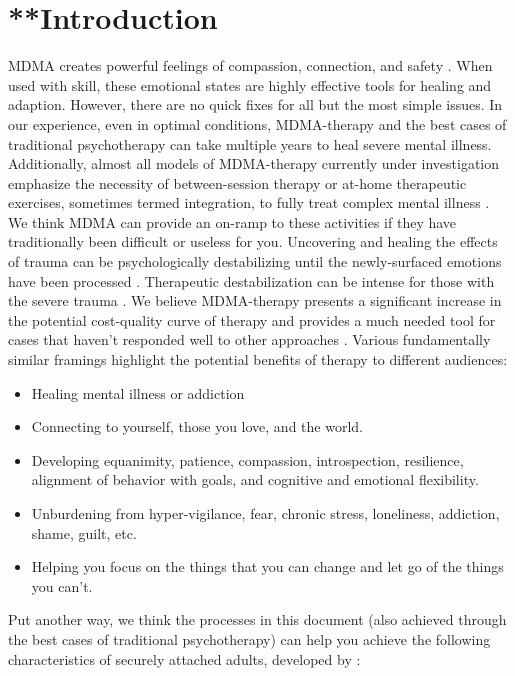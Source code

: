 \documentclass[12pt,letterpaper]{article}
\begin{document}
\section{**Introduction}
MDMA creates powerful feelings of compassion, connection, and safety \cite{fedduciaMDMAMemoryReconsolidation}. When used with skill, these emotional states are highly effective tools for healing and adaption. However, there are no quick fixes for all but the most simple issues. In our experience, even in optimal conditions, MDMA-therapy and the best cases of traditional psychotherapy can take multiple years to heal severe mental illness. Additionally, almost all models of MDMA-therapy currently under investigation emphasize the necessity of between-session therapy or at-home therapeutic exercises, sometimes termed integration, to fully treat complex mental illness \cite{bathje2022Integration}. We think MDMA can provide an on-ramp to these activities if they have traditionally been difficult or useless for you. Uncovering and healing the effects of trauma can be psychologically destabilizing until the newly-surfaced emotions have been processed \cite{olthofDestabilization}. Therapeutic destabilization can be intense for those with the severe trauma \cite{studyingHarms}. We believe MDMA-therapy presents a significant increase in the potential cost-quality curve of therapy and provides a much needed tool for cases that haven't responded well to other approaches \cite{mitchellMDMAClinicalTrial2}. Various fundamentally similar framings highlight the potential benefits of therapy to different audiences:
\begin{itemize}
    \item Healing mental illness or addiction
    \item Connecting to yourself, those you love, and the world.
    \item Developing equanimity, patience, compassion, introspection, resilience, alignment of behavior with goals, and cognitive and emotional flexibility.
    \item Unburdening from hyper-vigilance, fear, chronic stress, loneliness, addiction, shame, guilt, etc.
    \item Helping you focus on the things that you can change and let go of the things you can’t. 
\end{itemize}
Put another way, we think the processes in this document (also achieved through the best cases of traditional psychotherapy) can help you achieve the following characteristics of securely attached adults, developed by \textcite{brownAttachmentDisturbances}:
\end{document}
